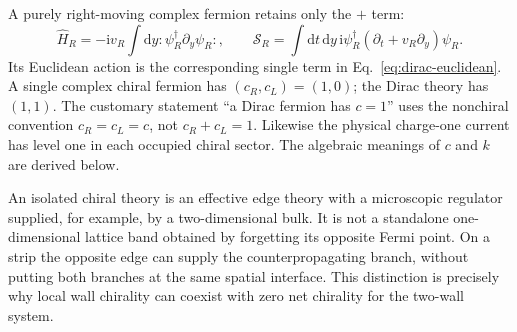 \documentclass[aps,prb,onecolumn,nofootinbib,superscriptaddress]{revtex4-2}
\newcommand{\dd}{\mathrm{d}}
\newcommand{\ii}{\mathrm{i}}
\begin{document}
A purely right-moving complex fermion retains only the $+$ term:
\begin{equation}
 \hat H_R=-\ii v_R\int\dd y:\!\psi_R^\dagger\partial_y\psi_R\!:,
 \qquad
 \mathcal S_R=\int\dd t\,\dd y\,
               \ii\psi_R^\dagger(\partial_t+v_R\partial_y)\psi_R.
 \label{eq:chiral-fermion}
\end{equation}
Its Euclidean action is the corresponding single term in
Eq.~\eqref{eq:dirac-euclidean}. A single complex chiral fermion has
$(c_R,c_L)=(1,0)$; the Dirac theory has $(1,1)$.
The customary statement ``a Dirac fermion has $c=1$'' uses the
nonchiral convention $c_R=c_L=c$, not $c_R+c_L=1$.
Likewise the physical charge-one current has level one in each occupied
chiral sector. The algebraic meanings of $c$ and $k$ are derived below.

An isolated chiral theory is an effective edge theory with a microscopic
regulator supplied, for example, by a two-dimensional bulk. It is not a
standalone one-dimensional lattice band obtained by forgetting its
opposite Fermi point. On a strip the opposite edge can supply the
counterpropagating branch, without putting both branches at the same
spatial interface. This distinction is precisely why local wall
chirality can coexist with zero net chirality for the two-wall system.
\end{document}
